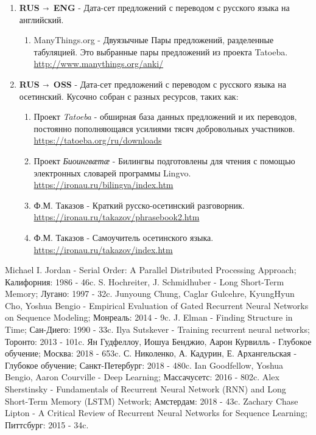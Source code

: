 \documentclass[a4paper,12pt]{article}
\begin{document}
	\begin{enumerate}
		\item \textbf{RUS $\shortrightarrow$ ENG} - Дата-сет предложений с переводом с русского языка на английский.
		\begin{enumerate}
			\item ManyThings.org - Двуязычные Пары предложений, разделенные табуляцией. 
			Это выбранные пары предложений из проекта Tatoeba. \\ 
			\url{http://www.manythings.org/anki/}
		\end{enumerate}
		\item \textbf{RUS $\shortrightarrow$ OSS} - Дата-сет предложений с переводом с русского языка на осетинский.
		Кусочно собран с разных ресурсов, таких как:
		\begin{enumerate}
			 \item Проект \textit{Tatoeba} - обширная база данных предложений и их переводов, постоянно пополняющаяся усилиями тясяч добровольных участников. \\ \url{https://tatoeba.org/ru/downloads}
			 \item Проект \textit{Биоингвӕтӕ} - Билингвы подготовлены для чтения с помощью электронных словарей программы Lingvo. \\ \url{https://ironau.ru/bilingva/index.htm}
			 \item Ф.М. Таказов - Краткий русско-осетинский разговорник. \\ \url{https://ironau.ru/takazov/phrasebook2.htm}
			 \item Ф.М. Таказов - Самоучитель осетинского языка. \\ \url{https://ironau.ru/takazov/index.htm}
 		\end{enumerate}
	\end{enumerate}

\newpage

	
	\begin{thebibliography}{}
		  Michael I. Jordan	-	Serial Order: A Parallel Distributed Processing Approach; Калифорния: 1986 - 46c. 
		  S. Hochreiter, J. Schmidhuber	-	Long Short-Term Memory; Лугано: 1997 - 32c.
		  Junyoung Chung, Caglar Gulcehre, KyungHyun Cho, Yoshua Bengio	-	Empirical Evaluation of Gated Recurrent Neural Networks on Sequence Modeling; Монреаль: 2014 - 9c.
		 J. Elman	-	Finding Structure in Time; Сан-Диего:  1990 - 33c.
		 Ilya Sutskever	-	Training recurrent neural networks; Торонто: 2013 - 101c.
		 Ян Гудфеллоу, Иошуа Бенджио, Аарон Курвилль	-	Глубокое обучение; Москва: 2018 - 653c. 
		 С. Николенко, А. Кадурин, Е. Архангельская	-	Глубокое обучение;  Санкт-Петербург: 2018 - 480c.
		 Ian Goodfellow, Yoshua Bengio, Aaron Courville	-	Deep Learning; Массачусетс: 2016 - 802c.
		 Alex Sherstinsky	-	Fundamentals of Recurrent Neural Network (RNN) and Long Short-Term Memory (LSTM) Network; Амстердам: 2018 - 43c.
		 Zachary Chase Lipton	-	A Critical Review of Recurrent Neural Networks for Sequence Learning; Питтсбург: 2015 - 34c.
	\end{thebibliography}
\end{document}
